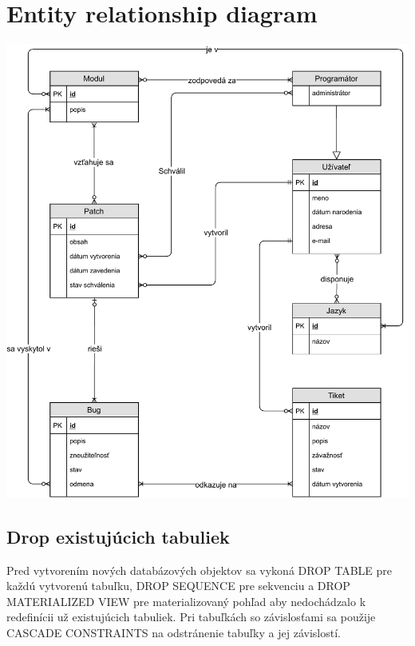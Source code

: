 \documentclass[11pt, a4paper]{article}
\begin{document}
    \section{Entity relationship diagram}
    \label{sec:entity-relationship-diagram}
    \begin{center}
        \vspace*{\fill}
        \includegraphics[width=0.95\linewidth]{ER_diagram.pdf}
        \vspace*{\fill}
    \end{center}

    \newpage

    \subsection{Drop existujúcich tabuliek}\label{subsec:drop-existujúcich-tabuliek}

    Pred vytvorením nových databázových objektov sa vykoná DROP TABLE pre každú vytvorenú tabuľku, DROP SEQUENCE pre sekvenciu a DROP MATERIALIZED VIEW pre materializovaný pohľad aby nedochádzalo k redefinícii už existujúcich tabuliek.
    Pri tabuľkách so závislosťami sa použije CASCADE CONSTRAINTS na odstránenie tabuľky a jej závislostí.
\end{document}
